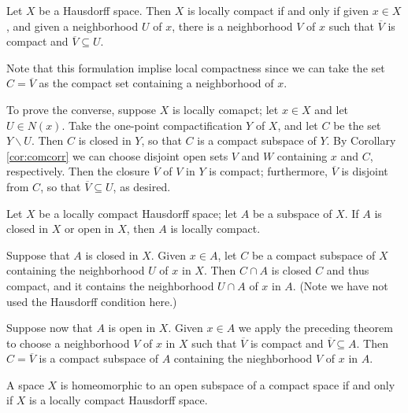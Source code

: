 \documentclass[12pt, a4paper, twoside, openright, titlepage]{book}
\begin{document}
\begin{thm}{}{}
    Let $X$ be a Hausdorff space. Then $X$ is locally compact if and only if given $x \in X$, and given a neighborhood $U$ of $x$, there is a neighborhood $V$ of $x$ such that $\overline{V}$ is compact and $\overline{V} \subseteq U$.
\end{thm}
\begin{proof*}{}{}
    Note that this formulation implise local compactness since we can take the set $C = \overline{V}$ as the compact set containing a neighborhood of $x$.

    To prove the converse, suppose $X$ is locally comapct; let $x \in X$ and let $U \in N(x)$. Take the one-point compactification $Y$ of $X$, and let $C$ be the set $Y \backslash U$. Then $C$ is closed in $Y$, so that $C$ is a compact subspace of $Y$. By Corollary \ref{cor:comcorr} we can choose disjoint open sets $V$ and $W$ containing $x$ and $C$, respectively. Then the closure $\overline{V}$ of $V$ in $Y$ is compact; furthermore, $\overline{V}$ is disjoint from $C$, so that $\overline{V} \subseteq U$, as desired.
\end{proof*}

\begin{cor}{}{}
    Let $X$ be a locally compact Hausdorff space; let $A$ be a subspace of $X$. If $A$ is closed in $X$ or open in $X$, then $A$ is locally compact.
\end{cor}
\begin{proof*}{}{}
    Suppose that $A$ is closed in $X$. Given $x \in A$, let $C$ be a compact subspace of $X$ containing the neighborhood $U$ of $x$ in $X$. Then $C\cap A$ is closed $C$ and thus compact, and it contains the neighborhood $U\cap A$ of $x$ in $A$. (Note we have not used the Hausdorff condition here.)

    Suppose now that $A$ is open in $X$. Given $x \in A$ we apply the preceding theorem to choose a neighborhood $V$ of $x$ in $X$ such that $\overline{V}$ is compact and $\overline{V} \subseteq A$. Then $C = \overline{V}$ is a compact subspace of $A$ containing the nieghborhood $V$ of $x$ in $A$.
\end{proof*}

\begin{cor}{}{}
    A space $X$ is homeomorphic to an open subspace of a compact space if and only if $X$ is a locally compact Hausdorff space.
\end{cor}
\end{document}
